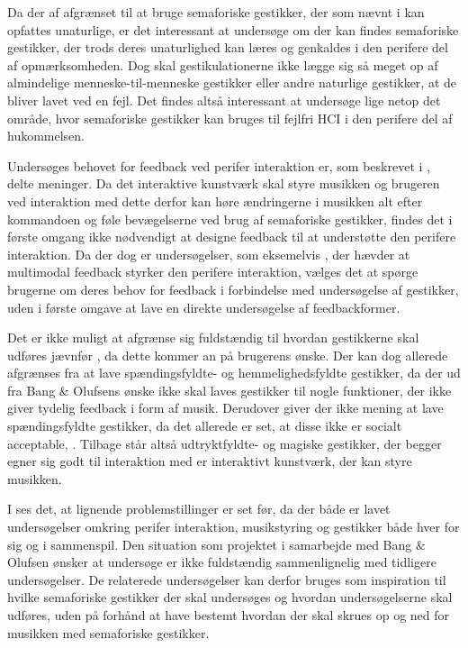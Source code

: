 Da der af afgrænset til at bruge semaforiske gestikker, der som nævnt i  kan opfattes unaturlige, er det interessant at undersøge om der kan findes semaforiske gestikker, der trods deres unaturlighed kan læres og genkaldes i den perifere del af opmærksomheden. Dog skal gestikulationerne ikke lægge sig så meget op af almindelige menneske-til-menneske gestikker eller andre naturlige gestikker, at de bliver lavet ved en fejl. Det findes altså interessant at undersøge lige netop det område, hvor semaforiske gestikker kan bruges til fejlfri HCI i den perifere del af hukommelsen. 

Undersøges behovet for feedback ved perifer interaktion er, som beskrevet i , delte meninger. Da det interaktive kunstværk skal styre musikken og brugeren ved interaktion med dette derfor kan høre ændringerne i musikken alt efter kommandoen og føle bevægelserne ved brug af semaforiske gestikker, findes det i første omgang ikke nødvendigt at designe feedback til at understøtte den perifere interaktion. Da der dog er undersøgelser, som eksemelvis \textcite[s. 21]{PDF:FacilitatingPIDesignAndEvaluation}, der hævder at multimodal feedback styrker den perifere interaktion, vælges det at spørge brugerne om deres behov for feedback i forbindelse med undersøgelse af gestikker, uden i første omgave at lave en direkte undersøgelse af feedbackformer. 

Det er ikke muligt at afgrænse sig fuldstændig til hvordan gestikkerne skal udføres jævnfør , da dette kommer an på brugerens ønske. Der kan dog allerede afgrænses fra at lave spændingsfyldte- og hemmelighedsfyldte gestikker, da der ud fra Bang $\&$ Olufsens ønske ikke skal laves gestikker til nogle funktioner, der ikke giver tydelig feedback i form af musik. Derudover giver der ikke mening at lave spændingsfyldte gestikker, da det allerede er set, at disse ikke er socialt acceptable, \parencite{PDF:WouldYouDoThat}. Tilbage står altså udtryktfyldte- og magiske gestikker, der begger egner sig godt til interaktion med er interaktivt kunstværk, der kan styre musikken. 

I  ses det, at lignende problemstillinger er set før, da der både er lavet undersøgelser omkring perifer interaktion, musikstyring og gestikker både hver for sig og i sammenspil. Den situation som projektet i samarbejde med Bang $\&$ Olufsen ønsker at undersøge er ikke fuldstændig sammenlignelig med tidligere undersøgelser. De relaterede undersøgelser kan derfor bruges som inspiration til hvilke semaforiske gestikker der skal undersøges og hvordan undersøgelserne skal udføres, uden på forhånd at have bestemt hvordan der skal skrues op og ned for musikken med semaforiske gestikker. 



